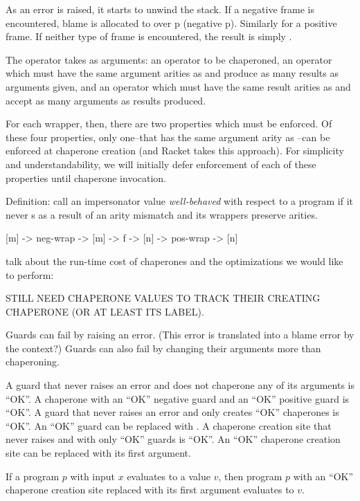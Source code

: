 \documentclass{sigplanconf}
\begin{document}
As an error is raised, it starts to unwind the stack. If a negative frame is encountered, blame is allocated to over p (negative p). Similarly for a positive frame. If neither type of frame is encountered, the result is simply .

The  operator takes as arguments: an operator  to be chaperoned, an operator  which must have the same argument arities as  and produce as many results as arguments given, and an operator  which must have the same result arities as  and accept as many arguments as results produced.

For each wrapper, then, there are two properties which must be enforced.
Of these four properties, only one--that  has the same argument arity as --can be enforced at chaperone creation (and Racket takes this approach). For simplicity and understandability, we will initially defer enforcement of each of these properties until chaperone invocation.

Definition: call an impersonator value \emph{well-behaved} with respect to a program if it never s as a result of an arity mismatch and its wrappers preserve arities.

[m] -> neg-wrap -> [m] -> f -> [n] -> pos-wrap -> [n]

talk about the run-time cost of chaperones and the optimizations we would like to perform:

STILL NEED CHAPERONE VALUES TO TRACK THEIR CREATING CHAPERONE (OR AT LEAST ITS LABEL).


Guards can fail by raising an error. (This error is translated into a blame error by the context?)
Guards can also fail by changing their arguments more than chaperoning.

A guard that never raises an error and does not chaperone any of its arguments is ``OK''.
A chaperone with an ``OK'' negative guard and an ``OK'' positive guard is ``OK''.
A guard that never raises an error and only creates ``OK'' chaperones is ``OK''.
An ``OK'' guard can be replaced with .
A chaperone creation site that never raises and with only ``OK'' guards is ``OK''.
An ``OK'' chaperone creation site can be replaced with its first argument.

If a program $p$ with input $x$ evaluates to a value $v$, then program $p$ with an ``OK'' chaperone creation site replaced with its first argument evaluates to $v$.
\end{document}
